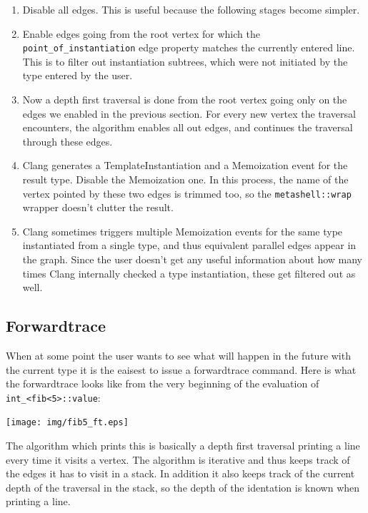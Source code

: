 \begin{enumerate}
    \item
        Disable all edges. This is useful because the following stages become
        simpler.
    \item
        Enable edges going from the root vertex for which the
        \verb|point_of_instantiation| edge property matches the currently
        entered line. This is to filter out instantiation subtrees, which were
        not initiated by the type entered by the user.
    \item
        Now a depth first traversal is done from the root vertex going only on
        the edges we enabled in the previous section. For every new vertex the
        traversal encounters, the algorithm enables all out edges, and
        continues the traversal through these edges.
    \item
        Clang generates a TemplateInstantiation and a Memoization event for the
        result type. Disable the Memoization one. In this process, the name of
        the vertex pointed by these two edges is trimmed too, so the
        \verb|metashell::wrap| wrapper doesn't clutter the result.
    \item
        Clang sometimes triggers multiple Memoization events for the same type
        instantiated from a single type, and thus equivalent parallel edges
        appear in the graph. Since the user doesn't get any useful information
        about how many times Clang internally checked a type instantiation,
        these get filtered out as well.
\end{enumerate}

\subsection{Forwardtrace}

When at some point the user wants to see what will happen in the future with
the current type it is the eaisest to issue a forwardtrace command. Here is
what the forwardtrace looks like from the very beginning of the evaluation of
\verb|int_<fib<5>::value|:

\bigskip

\texttt{[image: img/fib5\_ft.eps]}

The algorithm which prints this is basically a depth first traversal printing
a line every time it visits a vertex. The algorithm is iterative and thus keeps
track of the edges it has to visit in a stack. In addition it also keeps track
of the current depth of the traversal in the stack, so the depth of the
identation is known when printing a line.

